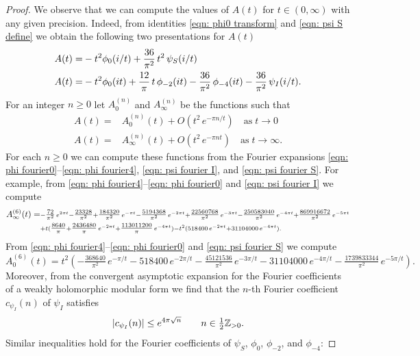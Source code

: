 \begin{proof}
\noindent We observe that we can compute the values of $A(t)$ for $t\in(0,\infty)$ with any given precision. Indeed, from identities \eqref{eqn: phi0 transform} and \eqref{eqn: psi S define} we obtain the following two presentations for $A(t)$
\begin{align}
  A(t)=&-t^2\phi_0(i/t)+\frac{36}{\pi^2}\,t^2\,\psi_S(i/t)\notag\\
  A(t)=&-t^2\phi_0(it)+\frac{12}{\pi}\,t\,\phi_{-2}(it)-\frac{36}{\pi^2}\,\phi_{-4}(it)-\frac{36}{\pi^2}\,\psi_I(i/t).\notag
\end{align}
For an integer $n\geq0$ let $A_0^{(n)}$ and  $A_{\infty}^{(n)}$ be the functions such that
\begin{align}
  A(t)=&A_0^{(n)}(t)+O(t^2\,e^{-\pi n /t})\quad\mbox{as}\;t\to0\label{eqn: A asymptotic expansion 0}\\
  A(t)=&A_\infty^{(n)}(t)+O(t^2\,e^{-\pi n t})\quad\mbox{as}\;t\to\infty.\label{eqn: A asymptotic expansion infty}
\end{align}
For each $n\geq 0$ we can compute these functions from the Fourier expansions \eqref{eqn: phi fourier0}--\eqref{eqn: phi fourier4}, \eqref{eqn: psi fourier I}, and \eqref{eqn: psi fourier S}.
  For example, from \eqref{eqn: phi fourier4}--\eqref{eqn: phi fourier0} and \eqref{eqn: psi fourier I} we compute
\begin{align}A_\infty^{(6)}(t)=&\scriptstyle-\tfrac{72}{\pi ^2}\, e^{2 \pi  t}-\tfrac{23328}{\pi ^2}+\tfrac{184320}{\pi ^2}\, e^{-\pi  t}-\tfrac{5194368}{\pi ^2}\, e^{-2 \pi  t}+\tfrac{22560768}{\pi ^2}\, e^{-3 \pi  t}-\tfrac{250583040}{\pi
    ^2}\, e^{-4 \pi  t}+\tfrac{869916672 }{\pi ^2}\,e^{-5 \pi  t}\notag\\&\scriptstyle+t(\tfrac{8640}{\pi }+\tfrac{2436480}{\pi }\, e^{-2 \pi  t}+\tfrac{113011200 }{\pi }\,e^{-4 \pi  t})-t^2(518400\,e^{-2 \pi  t}+31104000\,e^{-4 \pi  t}).\notag
\end{align}
From \eqref{eqn: phi fourier4}--\eqref{eqn: phi fourier0} and \eqref{eqn: psi fourier S} we compute
$$A_0^{(6)}(t)=t^2(-\tfrac{368640}{\pi ^2}\, e^{-\pi/t}-518400\, e^{-2\pi/t}-\tfrac{45121536}{\pi ^2}\, e^{-3\pi/t}-31104000\,e^{-4\pi/t}-\tfrac{1739833344}{\pi ^2}\, e^{-5\pi/t}).$$
Moreover, from the convergent asymptotic expansion for the Fourier coefficients of a weakly holomorphic modular form \cite[Proposition 1.12]{Bruinier} we find that the $n$-th Fourier coefficient $c_{\psi_I}(n)$ of $\psi_I$ satisfies
\begin{equation}\label{eqn: Fourier estimate 1}|c_{\psi_I}(n)|\leq e^{4\pi\sqrt{n}}\qquad n\in\tfrac 12 \mathbb{Z}_{>0}.\end{equation} Similar inequalities hold for the Fourier coefficients of $\psi_S$, $\phi_0$, $\phi_{-2}$, and $\phi_{-4}$:

\end{proof}
